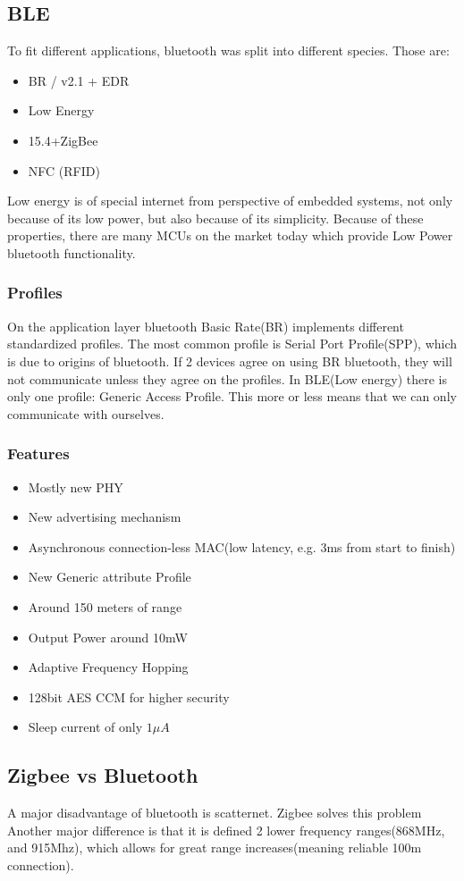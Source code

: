 \subsection{BLE}
To fit different applications, bluetooth was split into different species. Those are:
\begin{itemize}
        \item BR / v2.1 + EDR
        \item Low Energy
        \item 15.4+ZigBee
        \item NFC (RFID)
        
\end{itemize}
Low energy is of special internet from perspective of embedded systems, not only because of its low power, but also because of its simplicity.
Because of these properties, there are many MCUs on the market today which provide Low Power bluetooth functionality.

\subsubsection{Profiles}
On the application layer bluetooth Basic Rate(BR) implements different standardized profiles. The most common profile is Serial Port Profile(SPP), which is
due to origins of bluetooth. If 2 devices agree on using BR bluetooth, they will not communicate unless they agree on the profiles.
\nt
{
    In BLE(Low energy) there is only one profile: Generic Access Profile. This more or less means that we can only communicate with ourselves.
}

\subsubsection{Features}
\begin{itemize}
        \item Mostly new PHY
        \item New advertising mechanism
        \item Asynchronous connection-less MAC(low latency, e.g. 3ms from start to finish)
        \item New Generic attribute Profile
        \item Around 150 meters of range
        \item Output Power around 10mW
        \item Adaptive Frequency Hopping
        \item 128bit AES CCM for higher security
        \item Sleep current of only $1\mu A$
        
\end{itemize}
\subsection{Zigbee vs Bluetooth}
A major disadvantage of bluetooth is scatternet. Zigbee solves this problem
Another major difference is that it is defined 2 lower frequency ranges(868MHz, and 915Mhz), which allows for great
range increases(meaning reliable 100m connection).




